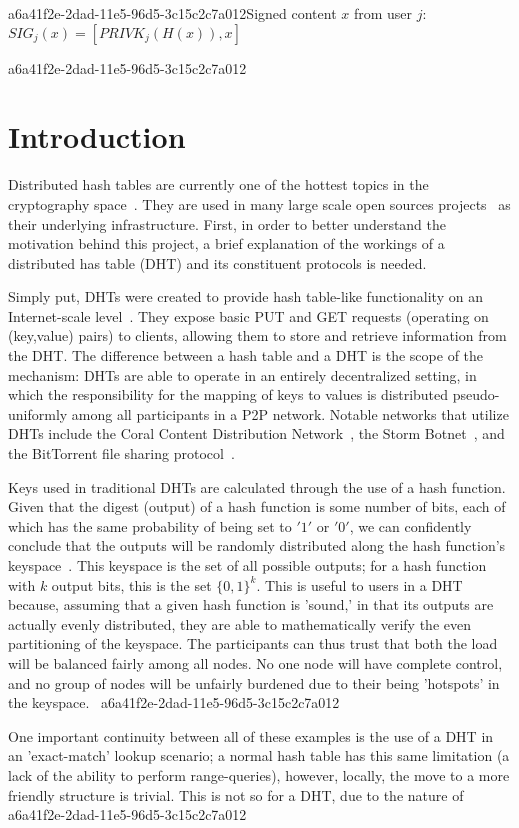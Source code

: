 \documentclass[12pt]{article}
\begin{document}
a6a41f2e-2dad-11e5-96d5-3c15c2c7a012Signed content $x$ from user $j$: $SIG_j(x) = \left[ PRIVK_j( H(x) ), x \right]$

a6a41f2e-2dad-11e5-96d5-3c15c2c7a012\section{Introduction}
\par Distributed hash tables are currently one of the hottest topics in the cryptography space~\cite{Stoica:2001dj,Rowstron:2001ea,Ratnasamy:2001wn}. They are used in many large scale open sources projects~\cite{Freitas:2013tb,Xu:2010vs,Perfitt:2010fh} as their underlying infrastructure. First, in order to better understand the motivation behind this project, a brief explanation of the workings of a distributed has table (DHT) and its constituent protocols is needed.

\par Simply put, DHTs were created to provide hash table-like functionality on an Internet-scale level~\cite{Ratnasamy:2001wn}. They expose basic PUT and GET requests (operating on (key,value) pairs) to clients, allowing them to store and retrieve information from the DHT. The difference between a hash table and a DHT is the scope of the mechanism: DHTs are able to operate in an entirely decentralized setting, in which the responsibility for the mapping of keys to values is distributed pseudo-uniformly among all participants in a P2P network. Notable networks that utilize DHTs include the Coral Content Distribution Network~\cite{Freedman:2004vb}, the Storm Botnet~\cite{Holz:2008uk}, and the BitTorrent file sharing protocol~\cite{Cohen:y1_8mBnw}.

\par Keys used in traditional DHTs are calculated through the use of a hash function. Given that the digest (output) of a hash function is some number of bits, each of which has the same probability of being set to $'1'$ or $'0'$, we can confidently conclude that the outputs will be randomly distributed along the hash function's keyspace~. This keyspace is the set of all possible outputs; for a hash function with $k$ output bits, this is the set $\{0,1\}^k$. This is useful to users in a DHT because, assuming that a given hash function is 'sound,' in that its outputs are actually evenly distributed, they are able to mathematically verify the even partitioning of the keyspace. The participants can thus trust that both the load will be balanced fairly among all nodes. No one node will have complete control, and no group of nodes will be unfairly burdened due to their being 'hotspots' in the keyspace.~
a6a41f2e-2dad-11e5-96d5-3c15c2c7a012
\par One important continuity between all of these examples is the use of a DHT in an 'exact-match' lookup scenario; a normal hash table has this same limitation (a lack of the ability to perform range-queries), however, locally, the move to a more friendly structure is trivial. This is not so for a DHT, due to the nature of
a6a41f2e-2dad-11e5-96d5-3c15c2c7a012\printbibliography
\end{document}
